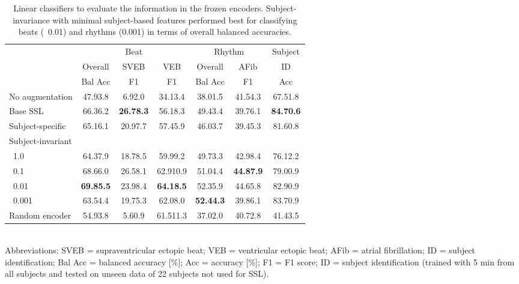 \documentclass{article}
\newcommand{\std}[1]{{\scriptsize{#1}}}
\begin{document}
\begin{table}
  \caption{Linear classifiers to evaluate the information in the frozen
  encoders. Subject-invariance with minimal subject-based features performed
  best for classifying beats (~0.01) and rhythms (0.001) in terms of overall balanced accuracies.}
  \label{table:ecg:inter}
  \centering
  \small
  \begin{tabular}{lcccccc}
    \toprule
    & \multicolumn{3}{c}{Beat}
    & \multicolumn{2}{c}{Rhythm}
    & Subject \\
    \cmidrule(lr){2-4}
    \cmidrule(lr){5-6}
    \cmidrule(lr){7-7}
    & Overall
    & \multicolumn{1}{c}{SVEB} & \multicolumn{1}{c}{VEB}
    & Overall & AFib
    & ID \\
    & Bal Acc & F1 & F1 & Bal Acc & F1 & Acc \\
    \hline

No augmentation
& 47.9\std{3.8} & 6.9\std{2.0} & 34.1\std{3.4}
& 38.0\std{1.5} & 41.5\std{4.3}
& 67.5\std{1.8} \\

Base SSL
& 66.3\std{6.2} & \textbf{26.7\std{8.3}} & 56.1\std{8.3}
& 49.4\std{3.4} & 39.7\std{6.1}
& \textbf{84.7\std{0.6}} \\

Subject-specific
& 65.1\std{6.1} & 20.9\std{7.7} & 57.4\std{5.9}
& 46.0\std{3.7} & 39.4\std{5.3}
& 81.6\std{0.8} \\

    Subject-invariant \\
\hspace{5pt}~1.0
& 64.3\std{7.9} & 18.7\std{8.5} & 59.9\std{9.2}
& 49.7\std{3.3} & 42.9\std{8.4}
& 76.1\std{2.2} \\

\hspace{5pt}~0.1
& 68.6\std{6.0} & 26.5\std{8.1}  & 62.9\std{10.9}
& 51.0\std{4.4} & \textbf{44.8\std{7.9}}
& 79.0\std{0.9}\\

\hspace{5pt}~0.01
& \textbf{69.8\std{5.5}} & 23.9\std{8.4} & \textbf{64.1\std{8.5}}
& 52.3\std{5.9} & 44.6\std{5.8}
& 82.9\std{0.9} \\

\hspace{5pt}~0.001
& 63.5\std{4.4} & 19.7\std{5.3} & 62.0\std{8.0}
& \textbf{52.4\std{4.3}} & 39.8\std{6.1}
& 83.7\std{0.9}\\

    \hline
Random encoder
& 54.9\std{3.8} & 5.6\std{0.9} & 61.5\std{11.3}
& 37.0\std{2.0} & 40.7\std{2.8}
    & 41.4\std{3.5} \\
    \bottomrule
  \end{tabular}\\
  \footnotesize{Abbreviations: SVEB = supraventricular ectopic beat; VEB =
  ventricular ectopic beat; AFib = atrial fibrillation; ID = subject
  identification; Bal Acc = balanced accuracy [\%]; Acc = accuracy [\%]; F1 = F1
  score; ID = subject identification (trained with 5 min from all subjects and
  tested on unseen data of 22 subjects not used for SSL).}
\end{table}
 
\end{document}

